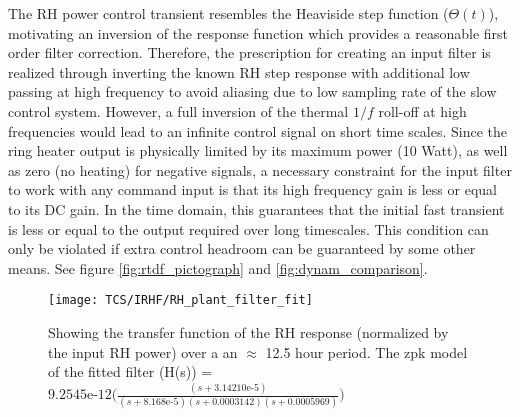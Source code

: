 The RH power control transient resembles the Heaviside step function ($\Theta(t)$), motivating an inversion of the response function which provides a reasonable first order filter correction. Therefore, the prescription for creating an input filter is realized through inverting the known RH step response with additional low passing at high frequency to avoid aliasing due to low sampling rate of the slow control system. However, a full inversion of the thermal $1/f$ roll-off at high frequencies would lead to an infinite control signal on short time scales. Since the ring heater output is physically limited by its maximum power (10 Watt), as well as zero (no heating) for negative signals, a necessary constraint for the input filter to work with any command input is that its high frequency gain is less or equal to its DC gain. In the time domain, this guarantees that the initial fast transient is less or equal to the output required over long timescales. This condition can only be violated if extra control headroom can be guaranteed by some other means. See figure \autoref{fig:rtdf_pictograph} and \autoref{fig:dynam_comparison}. 

\iffalse \swb{In previous paragraph: replace "avoid any high frequency control instability" with "avoid aliasing due to the low sampling rate of the slow control system." Furthermore, add "However, a full inversion of the thermal $1/f$ roll-off at high frequencies would lead to an infinite control signal on short time scales. Since the ring heater output is physically limited by its maximum power (10 Watt), as well as by zero (no heating) for negative signals, a necessary constraint for the input filter to work with any command input is that its high frequency gain is less or equal to its DC gain. In time domain, this guarantees that the initial fast transient is less or equal to the output required over long timescales.
This condition can only be violated if extra contreol headroom can be guarantees by some other mean. See figure 2.8 and 2.9."} \fi


\begin{figure}[H]
    \centering
    \texttt{[image: TCS/IRHF/RH\_plant\_filter\_fit]}
    \caption{Showing the transfer function of the RH response (normalized by the input RH power) over a an $\approx$ 12.5 hour period. The zpk model of the fitted filter (H(s)) = $9.2545\mathrm{e} \text{-}12 \Big(\frac{(s+3.14210\mathrm{e}\text{-}5)}{(s+8.168\mathrm{e}\text{-}5)(s+0.0003142)(s+0.0005969)}\Big)$}
    \label{fig:plant_v_fit}
\end{figure}

